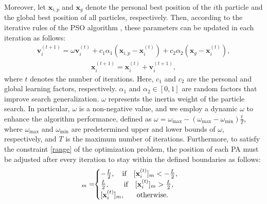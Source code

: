 \documentclass[summary]{ursi}
\begin{document}
Moreover, let $\mathbf{x}_{i,p}$ and $\mathbf{x}_{g}$ denote the personal best position of the $i$th particle and the global best position of all particles, respectively. Then, according to the iterative rules of the PSO algorithm \cite{PSO}, these parameters can be updated in each iteration as follows:
\begin{align}\label{velocity}
	\mathbf{v}^{(t+1)}_{i}\!\!=\omega\mathbf{v}^{(t)}_i\!+\!c_1\alpha_1(\mathbf{x}_{i,p}\!-\!\mathbf{x}^{(t)}_i)\!+\!c_2\alpha_2(\mathbf{x}_{g}\!-\!\mathbf{x}^{(t)}_i),
\end{align}
\begin{align}\label{position}
	\mathbf{x}^{(t+1)}_i=\mathbf{x}^{(t)}_i+\mathbf{v}^{(t+1)}_i,
\end{align}
where $t$ denotes the number of iterations. Here, $c_1$ and $c_2$ are the personal and global learning factors, respectively. $\alpha_1$ and $\alpha_2 \in [0,1]$ are random factors that improve search generalization. $\omega$ represents the inertia weight of the particle search. In particular, $\omega$ is a non-negative value, and we employ a dynamic $\omega$ to enhance the algorithm performance, defined as $\omega=\omega_{\max}-(\omega_{\max}-\omega_{\min})\frac{t}{T}$, where $\omega_{\max}$ and $\omega_{\min}$ are predetermined upper and lower bounds of $\omega$, respectively, and $T$ is the maximum number of iterations. Furthermore, to satisfy the constraint \eqref{range} of the optimization problem, the position of each PA must be adjusted after every iteration to stay within the defined boundaries as follows:
\begin{align}
	[\mathbf{x}^{(t)}_i]_m=\!\! \begin{cases}
	   -\frac{L}{2}, \quad  \textup{if} \quad	[\mathbf{x}^{(t)}_i]_m < -\frac{L}{2},\\ 
	   \frac{L}{2}, \quad  \ \ \ \textup{if} \quad	[\mathbf{x}^{(t)}_i]_m > \frac{L}{2},\\
	   [\mathbf{x}^{(t)}_i]_m, \quad  \ \  \textup{otherwise}.
	\end{cases}
\end{align}
\end{document}
